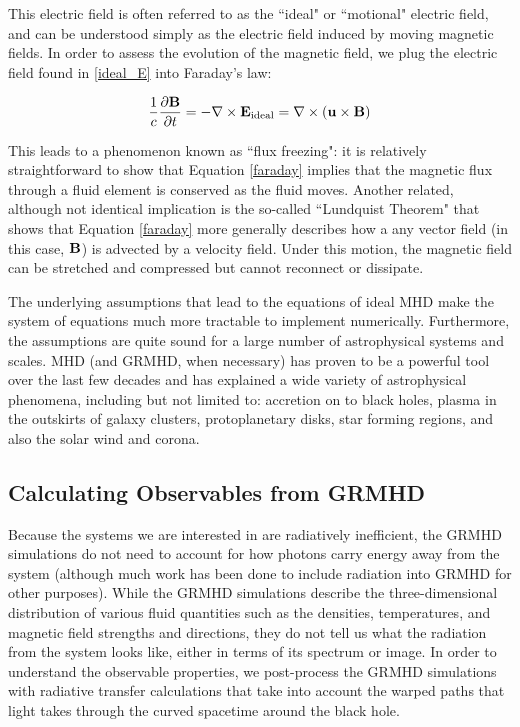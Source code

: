 This electric field is often referred to as the ``ideal" or ``motional" electric field, and can be understood simply as the electric field induced by moving magnetic fields.  In order to assess the evolution of the magnetic field, we plug the electric field found in \ref{ideal_E} into Faraday's law:

\begin{equation}
	\frac{1}{c}\frac{\partial \bold{B}}{\partial t} = - \nabla \times \bold{E_{\rm{ideal}}}=\nabla \times (\bold{u}\times\bold{B})
	\label{faraday}
\end{equation}

This leads to a phenomenon known as ``flux freezing": it is relatively straightforward to show that Equation \ref{faraday} implies that the magnetic flux through a fluid element is conserved as the fluid moves.  Another related, although not identical implication is the so-called ``Lundquist Theorem" that shows that Equation \ref{faraday} more generally describes how a any vector field (in this case, $\bold{B}$) is advected by a velocity field.  Under this motion, the magnetic field can be stretched and compressed but cannot reconnect or dissipate.

The underlying assumptions that lead to the equations of ideal MHD make the system of equations much more tractable to implement numerically.  Furthermore, the assumptions are quite sound for a large number of astrophysical systems and scales.  MHD (and GRMHD, when necessary) has proven to be a powerful tool over the last few decades and has explained a wide variety of astrophysical phenomena, including but not limited to: accretion on to black holes, plasma in the outskirts of galaxy clusters, protoplanetary disks, star forming regions, and also the solar wind and corona.

\subsection{Calculating Observables from GRMHD}
Because the systems we are interested in are radiatively inefficient, the GRMHD simulations do not need to account for how photons carry energy away from the system (although much work has been done to include radiation into GRMHD for other purposes).  While the GRMHD simulations describe the three-dimensional distribution of various fluid quantities such as the densities, temperatures, and magnetic field strengths and directions, they do not tell us what the radiation from the system looks like, either in terms of its spectrum or image.  In order to understand the observable properties, we post-process the GRMHD simulations with radiative transfer calculations that take into account the warped paths that light takes through the curved spacetime around the black hole.

